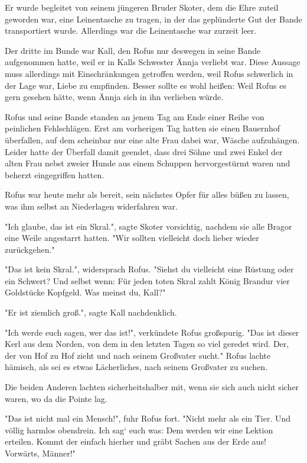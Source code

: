 \documentclass[10pt, a4paper, oneside]{book}
\begin{document}
\begin{multicols}{2}
Er wurde begleitet von seinem jüngeren Bruder Skoter, dem die Ehre zuteil geworden war, eine Leinentasche zu tragen, in der das geplünderte Gut der Bande transportiert wurde. Allerdings war die Leinentasche war zurzeit leer. 

Der dritte im Bunde war Kall, den Rofus nur deswegen in seine Bande aufgenommen hatte, weil er in Kalls Schwester Ännja verliebt war. Diese Aussage muss allerdings mit Einschränkungen getroffen werden, weil Rofus schwerlich in der Lage war, Liebe zu empfinden. Besser sollte es wohl heißen: Weil Rofus es gern gesehen hätte, wenn Ännja sich in ihn verlieben würde. 

Rofus und seine Bande standen an jenem Tag am Ende einer Reihe von peinlichen Fehlschlägen. Erst am vorherigen Tag hatten sie einen Bauernhof überfallen, auf dem scheinbar nur eine alte Frau dabei war, Wäsche aufzuhängen. Leider hatte der Überfall damit geendet, dass drei Söhne und zwei Enkel der alten Frau nebst zweier Hunde aus einem Schuppen hervorgestürmt waren und beherzt eingegriffen hatten. 

Rofus war heute mehr als bereit, sein nächstes Opfer für alles büßen zu lassen, was ihm selbst an Niederlagen widerfahren war. 

"Ich glaube, das ist ein Skral.", sagte Skoter vorsichtig, nachdem sie alle Bragor eine Weile angestarrt hatten. "Wir sollten vielleicht doch lieber wieder zurückgehen." 

"Das ist kein Skral.", widersprach Rofus. "Siehst du vielleicht eine Rüstung oder ein Schwert? Und selbst wenn: Für jeden toten Skral zahlt König Brandur vier Goldstücke Kopfgeld. Was meinst du, Kall?" 

"Er ist ziemlich groß.", sagte Kall nachdenklich. 

"Ich werde euch sagen, wer das ist!", verkündete Rofus großspurig. "Das ist dieser Kerl aus dem Norden, von dem in den letzten Tagen so viel geredet wird. Der, der von Hof zu Hof zieht und nach seinem Großvater sucht." Rofus lachte hämisch, als sei es etwas Lächerliches, nach seinem Großvater zu suchen. 

Die beiden Anderen lachten sicherheitshalber mit, wenn sie sich auch nicht sicher waren, wo da die Pointe lag. 

"Das ist nicht mal ein Mensch!", fuhr Rofus fort. "Nicht mehr als ein Tier. Und völlig harmlos obendrein. Ich sag‘ euch was: Dem werden wir eine Lektion erteilen. Kommt der einfach hierher und gräbt Sachen aus der Erde aus! Vorwärts, Männer!" 


\end{multicols}
\end{document}
